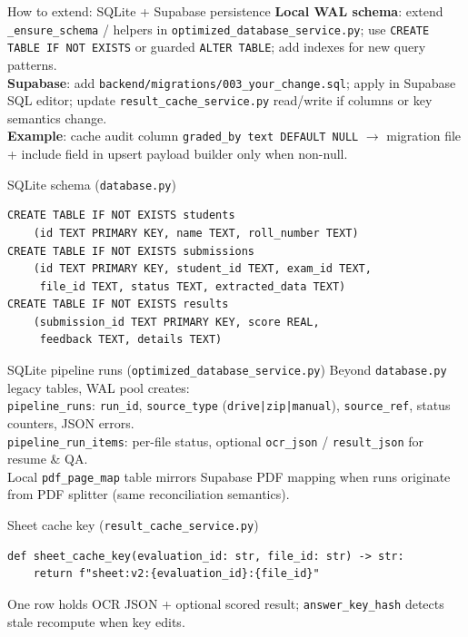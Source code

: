 \documentclass[aspectratio=169]{beamer}
\begin{document}
\begin{frame}{How to extend: SQLite + Supabase persistence}
  \small
  \textbf{Local WAL schema}: extend \texttt{\_ensure\_schema} / helpers in \texttt{optimized\_database\_service.py}; use \texttt{CREATE TABLE IF NOT EXISTS} or guarded \texttt{ALTER TABLE}; add indexes for new query patterns.\\
  \textbf{Supabase}: add \texttt{backend/migrations/003\_your\_change.sql}; apply in Supabase SQL editor; update \texttt{result\_cache\_service.py} read/write if columns or key semantics change.\\
  \textbf{Example}: cache audit column \texttt{graded\_by text DEFAULT NULL} $\rightarrow$ migration file + include field in upsert payload builder only when non-null.
\end{frame}

\begin{frame}[fragile]{SQLite schema (\texttt{database.py})}
\begin{lstlisting}[style=py]
CREATE TABLE IF NOT EXISTS students
    (id TEXT PRIMARY KEY, name TEXT, roll_number TEXT)
CREATE TABLE IF NOT EXISTS submissions
    (id TEXT PRIMARY KEY, student_id TEXT, exam_id TEXT,
     file_id TEXT, status TEXT, extracted_data TEXT)
CREATE TABLE IF NOT EXISTS results
    (submission_id TEXT PRIMARY KEY, score REAL,
     feedback TEXT, details TEXT)
\end{lstlisting}
\end{frame}

\begin{frame}[fragile]{SQLite pipeline runs (\texttt{optimized\_database\_service.py})}
  \tiny
  Beyond \texttt{database.py} legacy tables, WAL pool creates:\\[0.3em]
  \texttt{pipeline\_runs}: \texttt{run\_id}, \texttt{source\_type} (\texttt{drive|zip|manual}), \texttt{source\_ref}, status counters, JSON errors.\\
  \texttt{pipeline\_run\_items}: per-file status, optional \texttt{ocr\_json} / \texttt{result\_json} for resume \& QA.\\
  Local \texttt{pdf\_page\_map} table mirrors Supabase PDF mapping when runs originate from PDF splitter (same reconciliation semantics).
\end{frame}

\begin{frame}[fragile]{Sheet cache key (\texttt{result\_cache\_service.py})}
\begin{lstlisting}[style=py]
def sheet_cache_key(evaluation_id: str, file_id: str) -> str:
    return f"sheet:v2:{evaluation_id}:{file_id}"
\end{lstlisting}
\vfill
\tiny One row holds OCR JSON + optional scored result; \texttt{answer\_key\_hash} detects stale recompute when key edits.
\end{frame}
\end{document}
